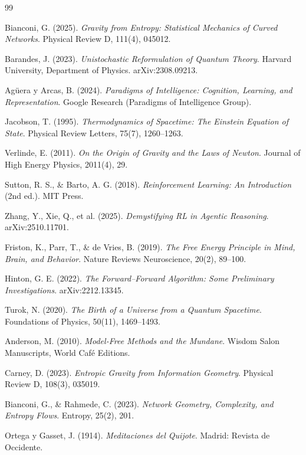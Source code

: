 \documentclass[11pt]{article}
\begin{document}
\begin{thebibliography}{99}

Bianconi, G. (2025). \textit{Gravity from Entropy: Statistical Mechanics of Curved Networks}. 
Physical Review D, 111(4), 045012.

Barandes, J. (2023). \textit{Unistochastic Reformulation of Quantum Theory}. 
Harvard University, Department of Physics. arXiv:2308.09213.

Agüera y Arcas, B. (2024). \textit{Paradigms of Intelligence: Cognition, Learning, and Representation}. 
Google Research (Paradigms of Intelligence Group).

Jacobson, T. (1995). \textit{Thermodynamics of Spacetime: The Einstein Equation of State}. 
Physical Review Letters, 75(7), 1260–1263.

Verlinde, E. (2011). \textit{On the Origin of Gravity and the Laws of Newton}. 
Journal of High Energy Physics, 2011(4), 29.

Sutton, R. S., \& Barto, A. G. (2018). \textit{Reinforcement Learning: An Introduction} (2nd ed.). 
MIT Press.

Zhang, Y., Xie, Q., et al. (2025). \textit{Demystifying RL in Agentic Reasoning}. 
arXiv:2510.11701.

Friston, K., Parr, T., \& de Vries, B. (2019). \textit{The Free Energy Principle in Mind, Brain, and Behavior}. 
Nature Reviews Neuroscience, 20(2), 89–100.

Hinton, G. E. (2022). \textit{The Forward–Forward Algorithm: Some Preliminary Investigations}. 
arXiv:2212.13345.

Turok, N. (2020). \textit{The Birth of a Universe from a Quantum Spacetime}. 
Foundations of Physics, 50(11), 1469–1493.

Anderson, M. (2010). \textit{Model-Free Methods and the Mundane}. 
Wisdom Salon Manuscripts, World Café Editions.

Carney, D. (2023). \textit{Entropic Gravity from Information Geometry}. 
Physical Review D, 108(3), 035019.

Bianconi, G., \& Rahmede, C. (2023). \textit{Network Geometry, Complexity, and Entropy Flows}. 
Entropy, 25(2), 201.

Ortega y Gasset, J. (1914). \textit{Meditaciones del Quijote}. 
Madrid: Revista de Occidente.

\end{thebibliography}
\end{document}

